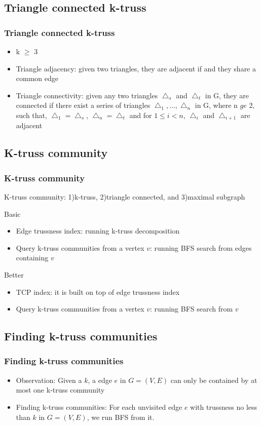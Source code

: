 \documentclass{beamer}
\begin{document}
\subsection{Triangle connected k-truss}
\begin{frame}
\frametitle{Triangle connected k-truss}
\begin{itemize}
\item k $\ge$ 3 
\item Triangle adjacency: given two triangles, they are adjacent if and they share a common edge
\item Triangle connectivity: given any two triangles $\bigtriangleup_{s}$ and $\bigtriangleup_{t}$ in G, they are connected if there exist a series of triangles $\bigtriangleup_{1},...,\bigtriangleup_{n}$ in G, where n $ge$ 2, such that, $\bigtriangleup_{1} = \bigtriangleup_{s}$, $\bigtriangleup_{n}=\bigtriangleup_{t}$ and for $1\le i< n $, $\bigtriangleup_{i}$ and $\bigtriangleup_{i+1}$ are adjacent 
\end{itemize}


\end{frame}

\subsection{K-truss community}
\begin{frame}
\frametitle{K-truss community}
\begin{definition}
K-truss community: 1)k-truss, 2)triangle connected, and 3)maximal subgraph
\end{definition}
Basic
\begin{itemize}
\item Edge trussness index: running k-truss decomposition
\item Query k-truss communities from a vertex $v$: running BFS search from edges containing $v$
\end{itemize}
Better
\begin{itemize}
\item TCP index: it is built on top of edge trussness index
\item Query k-truss communities from a vertex $v$: running BFS search from $v$
\end{itemize}
\end{frame}


\subsection{Finding k-truss communities}
\begin{frame}
\frametitle{Finding k-truss communities}
\begin{itemize}
\item Observation: Given a $k$, a edge $e$ in $G=(V,E)$ can only be contained by at most one k-truss community
\item Finding k-truss communities: For each unvisited edge $e$ with trussness no less than $k$ in $G=(V,E)$, we run BFS from it.
\end{itemize}
\end{frame}
\end{document}
